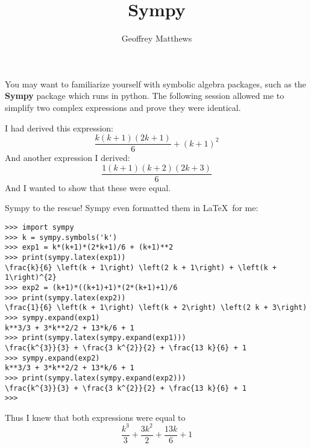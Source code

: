 \documentclass{article}
\title{Sympy}
\author{Geoffrey Matthews}
\begin{document}
\maketitle
  You may want to familiarize yourself with symbolic algebra packages,
  such as the {\bf Sympy} package which runs in python.  The following
  session allowed me to simplify two complex expressions
  and prove they were identical.

  I had derived this expression:
  \[
  \frac{k \left(k + 1\right) \left(2 k + 1\right)}{6} + \left(k + 1\right)^{2}
  \]
  And another expression I derived:
  \[
\frac{1 \left(k + 1\right) \left(k + 2\right) \left(2 k + 3\right)}{6}
\]
And I wanted to show that these were equal.

Sympy to the rescue!  
  Sympy even formatted them in \LaTeX\ for me:
  \begin{Verbatim}[frame=single]
>>> import sympy
>>> k = sympy.symbols('k')
>>> exp1 = k*(k+1)*(2*k+1)/6 + (k+1)**2
>>> print(sympy.latex(exp1))
\frac{k}{6} \left(k + 1\right) \left(2 k + 1\right) + \left(k + 1\right)^{2}
>>> exp2 = (k+1)*((k+1)+1)*(2*(k+1)+1)/6
>>> print(sympy.latex(exp2))
\frac{1}{6} \left(k + 1\right) \left(k + 2\right) \left(2 k + 3\right)
>>> sympy.expand(exp1)
k**3/3 + 3*k**2/2 + 13*k/6 + 1
>>> print(sympy.latex(sympy.expand(exp1)))
\frac{k^{3}}{3} + \frac{3 k^{2}}{2} + \frac{13 k}{6} + 1
>>> sympy.expand(exp2)
k**3/3 + 3*k**2/2 + 13*k/6 + 1
>>> print(sympy.latex(sympy.expand(exp2)))
\frac{k^{3}}{3} + \frac{3 k^{2}}{2} + \frac{13 k}{6} + 1
>>> 
 \end{Verbatim}
  Thus I knew that both expressions were equal to
  \[
  \frac{k^{3}}{3} + \frac{3 k^{2}}{2} + \frac{13 k}{6} + 1
  \]
\end{document}
